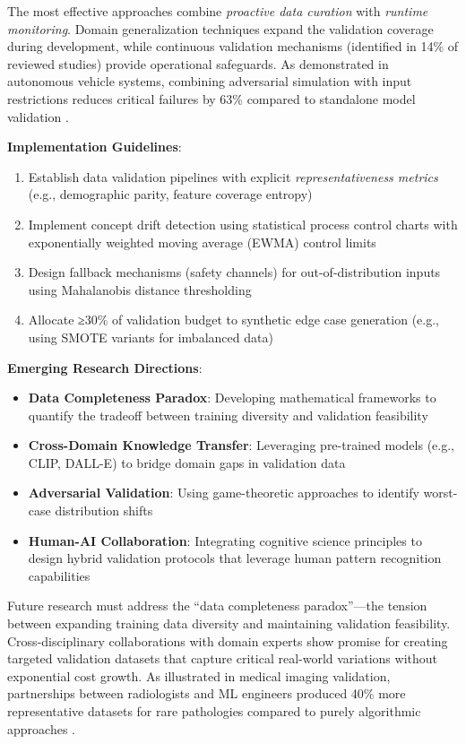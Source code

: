\documentclass[manuscript,screen,review]{acmart}
\begin{document}
The most effective approaches combine \textit{proactive data curation} with \textit{runtime monitoring}. Domain generalization techniques expand the validation coverage during development, while continuous validation mechanisms (identified in 14\% of reviewed studies) provide operational safeguards. As demonstrated in autonomous vehicle systems, combining adversarial simulation with input restrictions reduces critical failures by 63\% compared to standalone model validation .

\textbf{Implementation Guidelines}:
\begin{enumerate}
    \item Establish data validation pipelines with explicit \textit{representativeness metrics} (e.g., demographic parity, feature coverage entropy)
    \item Implement concept drift detection using statistical process control charts with exponentially weighted moving average (EWMA) control limits
    \item Design fallback mechanisms (safety channels) for out-of-distribution inputs using Mahalanobis distance thresholding
    \item Allocate ≥30\% of validation budget to synthetic edge case generation (e.g., using SMOTE variants for imbalanced data)
\end{enumerate}

\textbf{Emerging Research Directions}:
\begin{itemize}
    \item \textbf{Data Completeness Paradox}: Developing mathematical frameworks to quantify the tradeoff between training diversity and validation feasibility
    \item \textbf{Cross-Domain Knowledge Transfer}: Leveraging pre-trained models (e.g., CLIP, DALL-E) to bridge domain gaps in validation data
    \item \textbf{Adversarial Validation}: Using game-theoretic approaches to identify worst-case distribution shifts
    \item \textbf{Human-AI Collaboration}: Integrating cognitive science principles to design hybrid validation protocols that leverage human pattern recognition capabilities
\end{itemize}

Future research must address the ``data completeness paradox''---the tension between expanding training data diversity and maintaining validation feasibility. Cross-disciplinary collaborations with domain experts show promise for creating targeted validation datasets that capture critical real-world variations without exponential cost growth. As illustrated in medical imaging validation, partnerships between radiologists and ML engineers produced 40\% more representative datasets for rare pathologies compared to purely algorithmic approaches .
\end{document}
